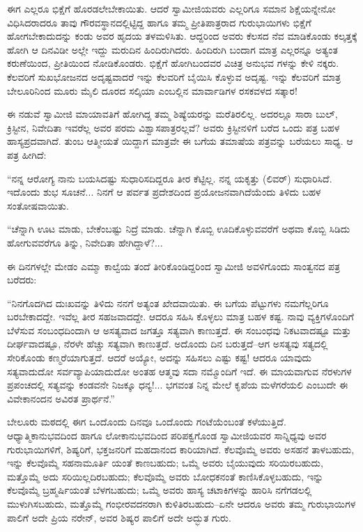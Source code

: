 ಈಗ ಎಲ್ಲರೂ ಭಿಕ್ಷೆಗೆ ಹೊರಡಲೇಬೇಕಾಯಿತು. ಆದರೆ ಸ್ವಾಮೀಜಿಯವರು ಎಲ್ಲರಿಗೂ ಸಮಾನ ಶಿಕ್ಷೆಯನ್ನೇನೋ ವಿಧಿಸಿದರಾದರೂ ತಾವು ಗೌರವಸ್ಥಾನದಲ್ಲಿಟ್ಟಿದ್ದ ಹಾಗೂ ತಮ್ಮ ಪ್ರೀತಿಪಾತ್ರರಾದ ಗುರುಭಾಯಿಗಳು ಭಿಕ್ಷೆಗೆ ಹೋಗಬೇಕಾದುದನ್ನು ಕಂಡು ಅವರ ಹೃದಯ ತಳಮಳಿಸಿತು. ಆದ್ದರಿಂದ ಅವರು ಕೆಲಸದ ನೆವ ಮಾಡಿಕೊಂಡು ಕಲ್ಕತ್ತಕ್ಕೆ ಹೋಗಿ ಆ ದಿನವಿಡೀ ಅಲ್ಲೇ ಇದ್ದು ಮರುದಿನ ಹಿಂದಿರುಗಿದರು. ಹಿಂದಿರುಗಿ ಬಂದಾಗ ಮಾತ್ರ ಎಲ್ಲರನ್ನೂ ಅತ್ಯಂತ ಕರುಣೆಯಿಂದ, ಪ್ರೀತಿಯಿಂದ ನೋಡಿಕೊಂಡರು. ಭಿಕ್ಷೆಗೆ ಹೋಗಿಬಂದವರ ವಿಚಿತ್ರ ಅನುಭವ ಗಳನ್ನು ಕೇಳಿ ನಕ್ಕರು. ಕೆಲವರಿಗೆ ಸುಖಭೋಜನದ ಅದೃಷ್ಟವಾದರೆ ಇನ್ನು ಕೆಲವರಿಗೆ ಬೈಯಿಸಿ ಕೊಳ್ಳುವ ಅದೃಷ್ಟ. ಇನ್ನು ಕೆಲವರಿಗೆ ಮಾತ್ರ ಬೇಲೂರಿನಿಂದ ಮೂರು ಮೈಲಿ ದೂರದ ಸಲ್ಕಿಯಾ ಎಂಬಲ್ಲಿನ ಮಾರ್ವಾಡಿಗಳ ರಸಕವಳದ ಸತ್ಕಾರ!

ಈ ನಡುವೆ ಸ್ವಾಮೀಜಿ ಮಾಯಾವತಿಗೆ ಹೋಗಿದ್ದ ತಮ್ಮ ಶಿಷ್ಯೆಯರನ್ನು ಮರೆತಿರಲಿಲ್ಲ. ಅದರಲ್ಲೂ ಸಾರಾ ಬುಲ್, ಕ್ರಿಸ್ಟೀನ, ನಿವೇದಿತಾ ಇವರೆಲ್ಲ ಅವರ ಪರಮ ವಿಶ್ವಾಸಪಾತ್ರರಲ್ಲವೆ? ಅವರು ಕ್ರಿಸ್ಟೀನಳಿಗೆ ಬರೆದ ಒಂದು ಪತ್ರ ಬಹಳ ಹಾಸ್ಯಪ್ರದವಾಗಿದೆ. ತುಂಬ ಆತ್ಮೀಯತೆ ಯಿದ್ದಾಗ ಮಾತ್ರವೇ ಈ ಬಗೆಯ ತಮಾಷೆಯ ಪತ್ರವನ್ನು ಬರೆಯಲು ಸಾಧ್ಯ. ಆ ಪತ್ರ ಹೀಗಿದೆ:

“ನನ್ನ ಆರೋಗ್ಯ ನಾನು ಬಯಸಿದಷ್ಟು ಸುಧಾರಿಸದಿದ್ದರೂ ತೀರ ಕೆಟ್ಟಿಲ್ಲ. ನನ್ನ ಯಕೃತ್ತು (ಲಿವರ್​) ಸುಧಾರಿಸಿದೆ. ಇದೊಂದು ಶುಭ ಸೂಚನೆ... ನಿನಗೆ ಆ ಪರ್ವತ ಪ್ರದೇಶದಿಂದ ಪ್ರಯೋಜನವಾಗಿದೆಯೆಂದು ತಿಳಿದು ಬಹಳ ಸಂತೋಷವಾಯಿತು.

“ಚೆನ್ನಾಗಿ ಊಟ ಮಾಡು, ಬೇಕೆಂಬಷ್ಟು ನಿದ್ರೆ ಮಾಡು. ಚೆನ್ನಾಗಿ ಕೊಬ್ಬಿ ಊದಿಕೊಳ್ಳುವವರೆಗೆ ಅಥವಾ ಕೊಬ್ಬಿ ಸಿಡಿದು ಹೋಗುವವರೆಗೂ ತಿನ್ನು, ನಿವೇದಿತಾ ಹೇಗಿದ್ದಾಳೆ?... 

ಈ ದಿನಗಳಲ್ಲೇ ಮೇಡಂ ಎಮ್ಮಾ ಕಾಲ್ವೆಯ ತಂದೆ ತೀರಿಕೊಂಡಿದ್ದರಿಂದ ಸ್ವಾಮೀಜಿ ಅವಳಿಗೊಂದು ಸಾಂತ್ವನದ ಪತ್ರ ಬರೆದರು:

“ನಿನಗೊದಗಿದ ದುಃಖವನ್ನು ತಿಳಿದು ನನಗೆ ಅತ್ಯಂತ ಖೇದವಾಯಿತು. ಈ ಬಗೆಯ ಪೆಟ್ಟುಗಳು ನಮಗೆಲ್ಲರಿಗೂ ಬರಬೇಕಾದದ್ದೇ. ಇವೆಲ್ಲ ತೀರ ಸಹಜವಾದದ್ದೇ. ಆದರೂ ಸಹಿಸಿ ಕೊಳ್ಳಲು ಮಾತ್ರ ಬಹಳ ಕಷ್ಟ. ನಾವು ವ್ಯಕ್ತಿಗಳೊಂದಿಗೆ ಬೆಳೆಸುವ ಸಂಬಂಧದಿಂದಾಗಿ ಆ ಅಸತ್ಯವಾದ ಜಗತ್ತೂ ಸತ್ಯವಾಗಿ ಕಾಣುತ್ತದೆ. ಈ ಸಂಬಂಧವು ನಿಕಟವಾದಷ್ಟೂ ಮತ್ತು ದೀರ್ಘವಾದಷ್ಟೂ, ನೆರಳೇ ಹೆಚ್ಚು ಸತ್ಯವಾಗಿ ಕಾಣುತ್ತದೆ. ಅದೊಂದು ದಿನ ಬರುತ್ತದೆ–ಆಗ ಅಸತ್ಯವು ಸತ್ಯದಲ್ಲಿ ಸೇರಿಕೊಂಡು ಕಣ್ಮರೆಯಾಗುತ್ತದೆ. ಆದರೆ ಅಯ್ಯೋ, ಅದನ್ನು ಸಹಿಸಲು ಎಷ್ಟು ಕಷ್ಟ! ಆದರೂ ಯಾವುದು ಸತ್ಯವಾದುದೋ ಸರ್ವವ್ಯಾಪಿಯಾದುದೋ ಅಂತಹ ಆತ್ಮವು ಸದಾ ನಮ್ಮೊಂದಿಗೆ ಇದೆ. ಈ ಮಾಯವಾಗುವ ನೆರಳುಗಳ ಪ್ರಪಂಚದಲ್ಲಿ ಸತ್ಯವನ್ನು ಕಂಡವನೇ ನಿಜಕ್ಕೂ ಧನ್ಯ!... ಭಗವಂತ ನಿನ್ನ ಮೇಲೆ ಕೃಪೆಯ ಮಳೆಗರೆಯಲಿ ಎಂಬುದೇ ಈ ವಿವೇಕಾನಂದನ ಅವಿರತ ಪ್ರಾರ್ಥನೆ.”

ಬೇಲೂರು ಮಠದಲ್ಲಿ ಈಗ ಒಂದೊಂದು ದಿನವೂ ಒಂದೊಂದು ಗಂಟೆಯೆಂಬಂತೆ ಕಳೆಯುತ್ತಿದೆ. ಆಧ್ಯಾತ್ಮಿಕಾನುಭವದಿಂದ ಹಾಗೂ ಲೋಕಾನುಭವದಿಂದ ಪರಿಪಕ್ವಗೊಂಡ ಸ್ವಾಮೀಜಿಯವರ ಸಾನ್ನಿಧ್ಯವು ಅವರ ಗುರುಭಾಯಿಗಳಿಗೆ, ಶಿಷ್ಯರಿಗೆ, ಭಕ್ತಜನರಿಗೆ ಮಹದಾನಂದ ಕಾರಿಯಾಗಿದೆ. ಕೆಲವೊಮ್ಮೆ ಅವರು ಅಸಹನೆ ತಾಳಬಹುದು, ಇನ್ನು ಕೆಲವೊಮ್ಮೆ ಸಹನಾಮೂರ್ತಿ ಯಂತೆ ಕಾಣಬಹುದು; ಒಮ್ಮೆ ಅವರು ಬೈಯುವುದು ಸರಿಯಿರಬಹುದು, ಮತ್ತೊಮ್ಮೆ ಅದು ಸರಿಯಿಲ್ಲದಿರಬಹುದು; ಕೆಲವೊಮ್ಮೆ ಅವರು ಬೋಧಕನಂತೆ ಕಾಣಿಸಿಕೊಳ್ಳಬಹುದು, ಇನ್ನು ಕೆಲವೊಮ್ಮೆ ಬ್ರಹ್ಮರ್ಷಿಯಂತೆ ಬೆಳಗಬಹುದು; ಒಮ್ಮೆ ಅವರು ಹಾಸ್ಯ ಚಟಾಕಿಗಳನ್ನು ಹಾರಿಸಿ ನಗೆಗಡಲಲ್ಲಿ ಮುಳುಗಿಸಬಹುದು, ಮತ್ತೊಮ್ಮೆ ಗಂಭೀರವದನರಾಗಿ ಕುಳಿತಿರಬಹುದು–ಏನೇ ಆದರೂ ಅವರು ತಮ್ಮ ಗುರುಭಾಯಿಗಳ ಪಾಲಿಗೆ ಅದೇ ಪ್ರಿಯ ನರೇನ್, ಅವರ ಶಿಷ್ಯರ ಪಾಲಿಗೆ ಅದೇ ಅದ್ಭುತ ಗುರು.

